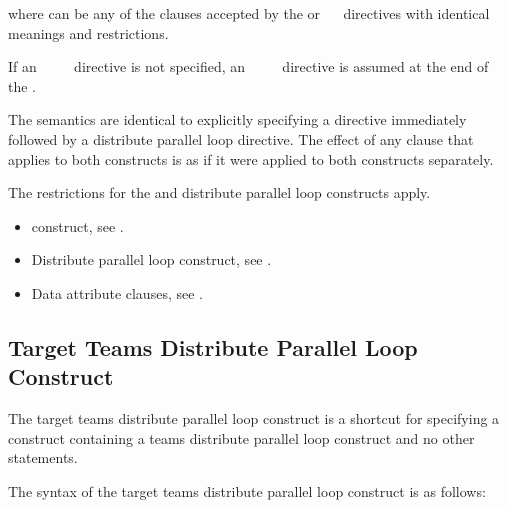 {{{{where  can be any of the clauses accepted by the  or 
~~ directives with identical meanings and restrictions.

If an ~~~~ directive is not specified, an 
~~~~ directive is assumed at the end of the .
\fortranspecificend

\descr
The semantics are identical to explicitly specifying a  directive immediately 
followed by a distribute parallel loop directive. The effect of any clause that applies to 
both constructs is as if it were applied to both constructs separately.

\restrictions
The restrictions for the  and distribute parallel loop constructs apply.

\crossreferences
\begin{itemize}
\item {} construct, see 
.

\item Distribute parallel loop construct, see 
.

\item Data attribute clauses, see 
.
\end{itemize}









\subsection{Target Teams Distribute Parallel Loop Construct}
\label{subsec:Target Teams Distribute Parallel Loop Construct}
\summary
The target teams distribute parallel loop construct is a shortcut for specifying a  
construct containing a teams distribute parallel loop construct and no other statements.

\syntax
\ccppspecificstart
The syntax of the target teams distribute parallel loop construct is as follows:

}}}}
